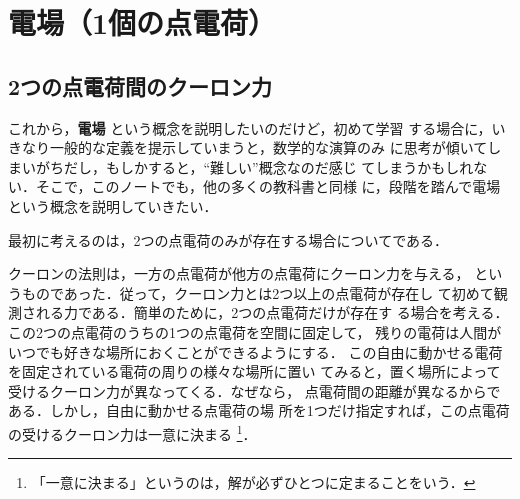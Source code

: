             \section{電場（1個の点電荷）}
    \subsection{2つの点電荷間のクーロン力}
                これから，\textbf{電場} という概念を説明したいのだけど，初めて学習
                する場合に，いきなり一般的な定義を提示していまうと，数学的な演算のみ
                に思考が傾いてしまいがちだし，もしかすると，“難しい”概念なのだ感じ
                てしまうかもしれない．そこで，このノートでも，他の多くの教科書と同様
                に，段階を踏んで電場という概念を説明していきたい．

                最初に考えるのは，2つの点電荷のみが存在する場合についてである．

                クーロンの法則は，一方の点電荷が他方の点電荷にクーロン力を与える，
                というものであった．従って，クーロン力とは2つ以上の点電荷が存在し
                て初めて観測される力である．簡単のために，2つの点電荷だけが存在す
                る場合を考える．この2つの点電荷のうちの1つの点電荷を空間に固定して，
                残りの電荷は人間がいつでも好きな場所におくことができるようにする．
                この自由に動かせる電荷を固定されている電荷の周りの様々な場所に置い
                てみると，置く場所によって受けるクーロン力が異なってくる．なぜなら，
                点電荷間の距離が異なるからである．しかし，自由に動かせる点電荷の場
                所を1つだけ指定すれば，この点電荷の受けるクーロン力は一意に決まる
                    \footnote{
                        「一意に決まる」というのは，解が必ずひとつに定まることをいう．
                    }．

